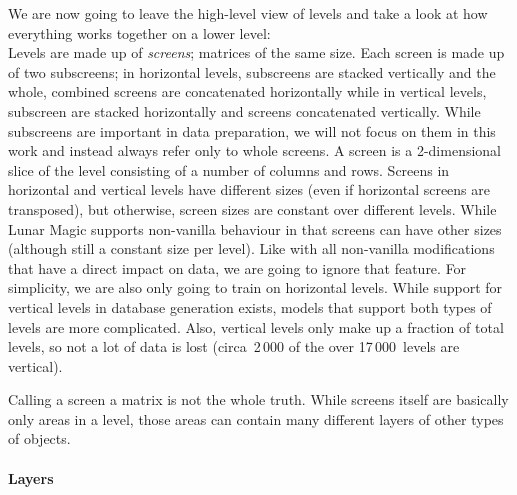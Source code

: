 We are now going to leave the high-level view of levels and take a
look at how everything works together on a lower level: \\
Levels are made up of \emph{screens}; matrices of the same size. Each
screen is made up of two subscreens; in horizontal levels, subscreens
are stacked vertically and the whole, combined screens are
concatenated horizontally while in vertical levels, subscreen are
stacked horizontally and screens concatenated vertically. While
subscreens are important in data preparation, we will not focus on
them in this work and instead always refer only to whole screens. A
screen is a 2-dimensional slice of the level consisting of a number of
columns and rows. Screens in horizontal and vertical levels have
different sizes (even if horizontal screens are transposed), but
otherwise, screen sizes are constant over different levels. While
Lunar Magic supports non-vanilla behaviour in that screens can have
other sizes (although still a constant size per level). Like with all
non-vanilla modifications that have a direct impact on data, we are
going to ignore that feature. For simplicity, we are also only going
to train on horizontal levels. While support for vertical levels in
database generation exists, models that support both types of levels
are more complicated. Also, vertical levels only make up a fraction of
total levels, so not a lot of data is lost (circa~2\,000 of the over
17\,000~levels are vertical).

Calling a screen a matrix is not the whole truth. While screens itself
are basically only areas in a level, those areas can contain many
different layers of other types of objects.

\paragraph{Layers}
\label{par:layers}

